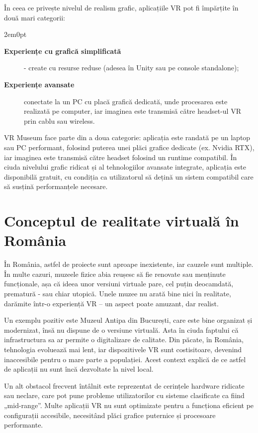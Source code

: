 \noindent În ceea ce privește nivelul de realism grafic, aplicațiile VR pot fi împărțite în două mari categorii:

\begin{adjustwidth}{2em}{0pt}
\begin{description}
    \item[\textbf{Experiențe cu grafică simplificată}] - create cu resurse reduse (adesea în Unity sau pe console standalone);   
    \item[\textbf{Experiențe avansate}] conectate la un PC cu placă grafică dedicată, unde procesarea este realizată pe computer, iar imaginea este transmisă către headset-ul VR prin cablu sau wireless.
\end{description}
\end{adjustwidth}

\noindent VR Museum face parte din a doua categorie: aplicația este randată pe un laptop sau PC performant, folosind puterea unei plăci grafice dedicate (ex. Nvidia RTX), iar imaginea este transmisă către headset folosind un runtime compatibil. În ciuda nivelului grafic ridicat și al tehnologiilor avansate integrate, aplicația este disponibilă gratuit, cu condiția ca utilizatorul să dețină un sistem compatibil care să susțină performanțele necesare.

\section{Conceptul de realitate virtuală în România}

În România, astfel de proiecte sunt aproape inexistente, iar cauzele sunt multiple. În multe cazuri, muzeele fizice abia reușesc să fie renovate sau menținute funcționale, așa că ideea unor versiuni virtuale pare, cel puțin deocamdată, prematură - sau chiar utopică. Unele muzee nu arată bine nici în realitate, darămite într-o experiență VR – un aspect poate amuzant, dar realist.

Un exemplu pozitiv este Muzeul Antipa din București, care este bine organizat și modernizat, însă nu dispune de o versiune virtuală. Asta în ciuda faptului că infrastructura sa ar permite o digitalizare de calitate. 
Din păcate, în România, tehnologia evoluează mai lent, iar dispozitivele VR sunt costisitoare, devenind inaccesibile pentru o mare parte a populației. Acest context explică de ce astfel de aplicații nu sunt încă dezvoltate la nivel local.

Un alt obstacol frecvent întâlnit este reprezentat de cerințele hardware ridicate sau neclare, care pot pune probleme utilizatorilor cu sisteme clasificate ca fiind „mid-range”. Multe aplicații VR nu sunt optimizate pentru a funcționa eficient pe configurații accesibile, necesitând plăci grafice puternice și procesoare performante.

